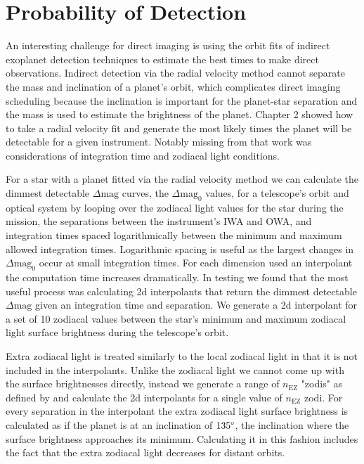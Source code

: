 
\section{Probability of Detection} %
\label{section:impact_on_pdet}

An interesting challenge for direct imaging is using the orbit fits of indirect
exoplanet detection techniques to estimate the best times to make direct
observations. Indirect detection via the radial velocity method cannot separate
the mass and inclination of a planet's orbit, which complicates direct imaging
scheduling because the inclination is important for the planet-star separation
and the mass is used to estimate the brightness of the planet. Chapter 2 showed
how to take a radial velocity fit and generate the most likely times the planet
will be detectable for a given instrument. Notably missing from that work was
considerations of integration time and zodiacal light conditions.

For a star with a planet fitted via the radial velocity method we can calculate
the dimmest detectable $\Delta\textrm{mag}$ curves, the $\Delta\textrm{mag}_0$
values, for a telescope's orbit and optical system by looping over the zodiacal
light values for the star during the mission, the separations between the
instrument's IWA and OWA, and integration times spaced logarithmically between
the minimum and maximum allowed integration times. Logarithmic spacing is
useful as the largest changes in $\Delta\textrm{mag}_0$ occur at small
integration times. For each dimension used an interpolant the computation time
increases dramatically. In testing we found that the most useful process was
calculating 2d interpolants that return the dimmest detectable
$\Delta\textrm{mag}$ given an integration time and separation. We generate a 2d
interpolant for a set of 10 zodiacal values between the star's minimum and
maximum zodiacal light surface brightness during the telescope's orbit. 

Extra zodiacal light is treated similarly to the local zodiacal light in that
it is not included in the interpolants. Unlike the zodiacal light we cannot
come up with the surface brightnesses directly, instead we generate a range of
$n_\textrm{EZ}$ "zodis" as defined by
\citet{starkMaximizingExoEarthCandidate2014} and calculate the 2d interpolants
for a single value of $n_\textrm{EZ}$ zodi. For every separation in the
interpolant the extra zodiacal light surface brightness is calculated as if the
planet is at an inclination of $135\degree$, the inclination where the surface
brightness approaches its minimum. Calculating it in this fashion includes the
fact that the extra zodiacal light decreases for distant orbits.


